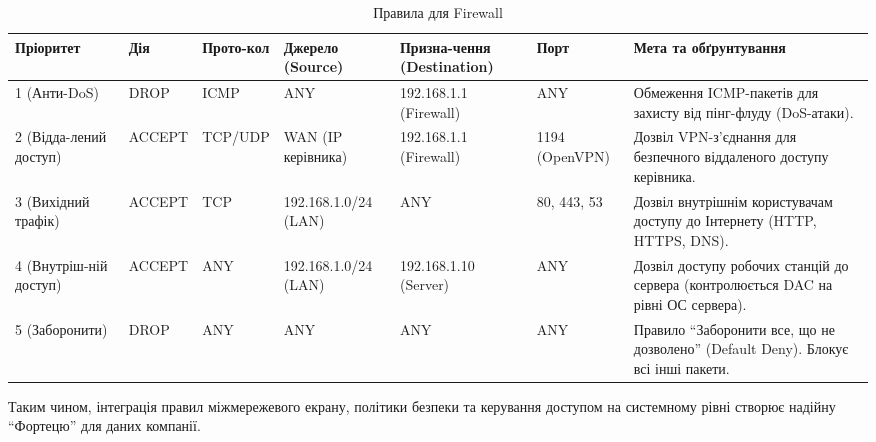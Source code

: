 \begin{table}[h]
    \small
    \centering
    \caption{Правила для Firewall}
    \label{tab:appendix_firewall}
    \begin{tabular}{|p{1.8cm}|p{1.8cm}|p{1.5cm}|p{2.4cm}|p{2cm}|p{2cm}|p{2.8cm}|}
        \hline
        Пріоритет & Дія & Прото-кол & Джерело (Source) & Призна-чення (Destination) & Порт & Мета та обґрунтування \\
        \hline
        1 (Анти-DoS) & DROP & ICMP & ANY & 192.168.1.1 (Firewall) & ANY & Обмеження ICMP-пакетів для захисту від пінг-флуду (DoS-атаки). \\
        \hline
        2 (Відда-лений доступ) & ACCEPT & TCP/UDP & WAN (IP керівника) & 192.168.1.1 (Firewall) & 1194 (OpenVPN) & Дозвіл VPN-з'єднання для безпечного віддаленого доступу керівника. \\
        \hline
        3 (Вихідний трафік) & ACCEPT & TCP & 192.168.1.0/24 (LAN) & ANY & 80, 443, 53 & Дозвіл внутрішнім користувачам доступу до Інтернету (HTTP, HTTPS, DNS). \\
        \hline
        4 (Внутріш-ній доступ) & ACCEPT & ANY & 192.168.1.0/24 (LAN) & 192.168.1.10 (Server) & ANY & Дозвіл доступу робочих станцій до сервера (контролюється DAC на рівні ОС сервера). \\
        \hline
        5 (Заборонити) & DROP & ANY & ANY & ANY & ANY & Правило ``Заборонити все, що не дозволено'' (Default Deny). Блокує всі інші пакети. \\
        \hline
    \end{tabular}
\end{table}



Таким чином, інтеграція правил міжмережевого екрану, політики безпеки та керування доступом на системному рівні створює надійну ``Фортецю'' для даних компанії.